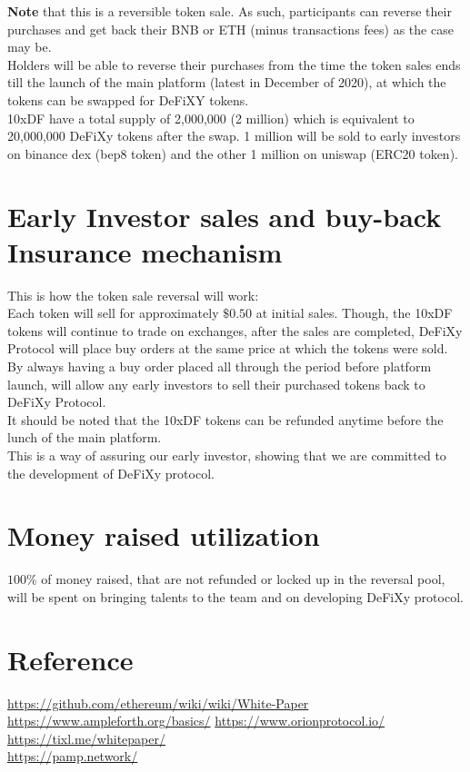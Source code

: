 \documentclass[12pt,onecolumn,letterpaper]{article} %
\begin{document}
\textbf{Note} that this is a reversible token sale. As such, participants can reverse their purchases and get back their BNB or ETH (minus transactions fees) as the case may be.\\

Holders will be able to reverse their purchases from the time the token sales ends till the launch of the main platform (latest in December of 2020), at which the tokens can be swapped for DeFiXY tokens.\\

10xDF have a total supply of 2,000,000 (2 million) which is equivalent to 20,000,000 DeFiXy tokens after the swap. 1 million will be sold to early investors on binance dex (bep8 token) and the other 1 million on uniswap (ERC20 token).
\section{Early Investor sales and buy-back Insurance mechanism}
This is how the token sale reversal will work:\\
Each token will sell for approximately $\$0.50$ at initial sales. Though, the 10xDF tokens will continue to trade on exchanges, after the sales are completed, DeFiXy Protocol will place buy orders at the same price at which the tokens were sold. By always having a buy order placed all through the period before platform launch, will allow any early investors to sell their purchased tokens back to DeFiXy Protocol.\\
It should be noted that the 10xDF tokens can be refunded anytime before the lunch of the main platform.\\
This is a way of assuring our early investor, showing that we are committed to the development of DeFiXy protocol.
\section{Money raised utilization}
$100\%$ of money raised, that are not refunded or locked up in the reversal pool, will be spent on bringing talents to the team and on developing DeFiXy protocol.
\newpage
\section*{Reference}
\url{https://github.com/ethereum/wiki/wiki/White-Paper}\\
\url{https://www.ampleforth.org/basics/}
\url{https://www.orionprotocol.io/}\\
\url{https://tixl.me/whitepaper/}\\
\url{https://pamp.network/}
\end{document}
